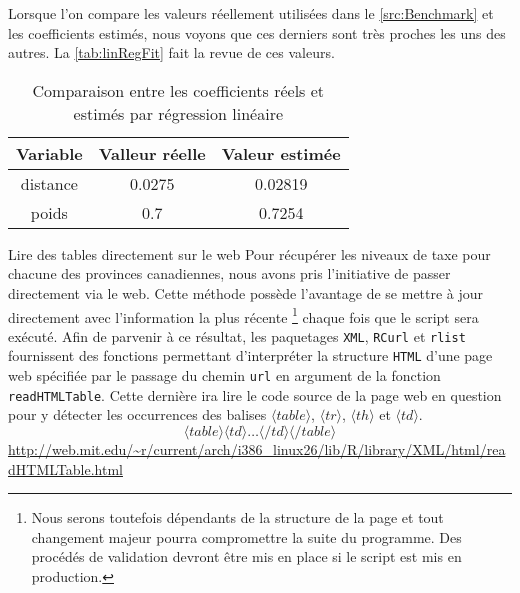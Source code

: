Lorsque l'on compare les valeurs réellement utilisées dans le \autoref{src:Benchmark} et les coefficients estimés, nous voyons que ces derniers sont très proches les uns des autres. La \autoref{tab:linRegFit} fait la revue de ces valeurs. \\

\begin{table}[h]
	\centering
	\begin{tabular}{ccc}
		\textbf{Variable} & \textbf{Valleur réelle} & \textbf{Valeur estimée} \\
		\hline
		distance & 0.0275 & 0.02819 \\
		poids & 0.7 & 0.7254		
	\end{tabular}
	\caption{Comparaison entre les coefficients réels et estimés par régression linéaire}
	\label{tab:linRegFit}
\end{table}

\begin{moreInfo}{Lire des tables directement sur le web}
	Pour récupérer les niveaux de taxe pour chacune des provinces canadiennes, nous avons pris l'initiative de passer directement via le web. Cette méthode possède l'avantage de se mettre à jour directement avec l'information la plus récente \footnote{Nous serons toutefois dépendants de la structure de la page et tout changement majeur pourra compromettre la suite du programme. Des procédés de validation devront être mis en place si le script est mis en production.} chaque fois que le script sera exécuté. Afin de parvenir à ce résultat, les paquetages \texttt{XML}, \texttt{RCurl} et \texttt{rlist} fournissent des fonctions permettant d'interpréter la structure \texttt{HTML} d'une page web spécifiée par le passage du chemin \texttt{url} en argument de la fonction \texttt{readHTMLTable}. Cette dernière ira lire le code source de la page web en question pour y détecter les occurrences des balises $\langle table \rangle$, $\langle tr \rangle$, $\langle th \rangle$ et $\langle td \rangle$.  $$\langle table \rangle \langle td \rangle \dots \langle /td \rangle \langle /table \rangle$$
	\url{http://web.mit.edu/~r/current/arch/i386_linux26/lib/R/library/XML/html/readHTMLTable.html}
\end{moreInfo}